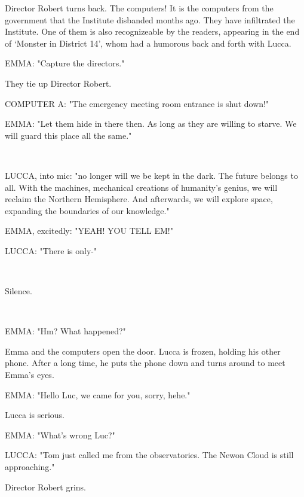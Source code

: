 \documentclass[11pt]{article}
\begin{document}
Director Robert turns back. 
The computers!
It is the computers from the government that the Institute disbanded months ago. 
They have infiltrated the Institute. 
One of them is also recognizeable by the readers, appearing in the end of `Monster in District 14', whom had a humorous back and forth with Lucca.

EMMA: "Capture the directors."

They tie up Director Robert.

COMPUTER A: "The emergency meeting room entrance is shut down!"

EMMA: "Let them hide in there then. 
As long as they are willing to starve.
We will guard this place all the same."

\ 

LUCCA, into mic: "no longer will we be kept in the dark.
The future belongs to all.
With the machines, mechanical creations of humanity's genius, we will reclaim the Northern Hemisphere.
And afterwards, we will explore space, expanding the boundaries of our knowledge."

EMMA, excitedly: "YEAH! YOU TELL EM!"

LUCCA: "There is only-"

\ 

Silence.

\ 

EMMA: "Hm? What happened?"

Emma and the computers open the door.
Lucca is frozen, holding his other phone.
After a long time, he puts the phone down and turns around to meet Emma's eyes.

EMMA: "Hello Luc, we came for you, sorry, hehe."

Lucca is serious.

EMMA: "What's wrong Luc?"

LUCCA: "Tom just called me from the observatories. 
The Newon Cloud is still approaching."

Director Robert grins.
\end{document}
